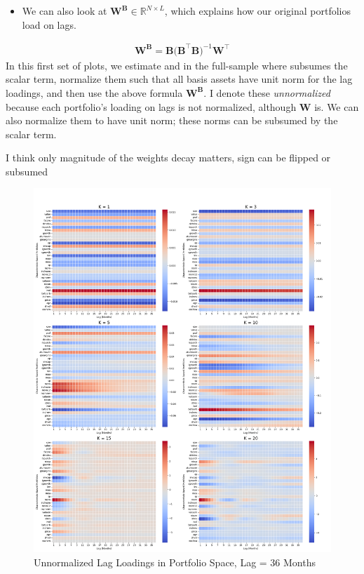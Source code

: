 \documentclass{article}
\newcommand{\R}{{\mathbb R}}
\begin{document}
\begin{itemize}
    \item We can also look at $\bm{W^B} \in \R^{N \times L}$, which explains how our original portfolios load on lags.
\end{itemize}
\begin{align}
    \bm{W^{B}} = \bm{B(B}^\top \bm{B)}^{-1} \bm{W}^\top
\end{align}
In this first set of plots, we estimate  and  in the full-sample where  subsumes the scalar term, normalize them such that all 
basis assets have unit norm for the lag loadings, and then use the above formula $\bm{W^B}$. I denote these \emph{unnormalized} because 
each portfolio's loading on lags is not normalized, although $\bm{W}$ is. We can also normalize them to have unit norm; these 
norms can be subsumed by the scalar term. 

I think only magnitude of the weights decay matters, sign can be flipped or subsumed

\begin{figure}[H]
    \centering
    \includegraphics[width=1\linewidth]{WB_36_unnorm.png}
    \caption{Unnormalized Lag Loadings in Portfolio Space, Lag = 36 Months}
    \label{fig:WB_36}
\end{figure}
\end{document}
